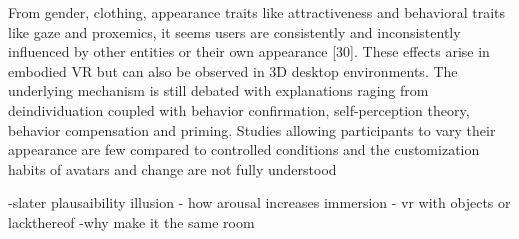 From gender, clothing, appearance traits like attractiveness and behavioral traits like gaze and proxemics, it seems users are consistently and inconsistently influenced by other entities or their own appearance [30].  These effects arise in embodied VR but can also be observed in 3D desktop environments. The underlying mechanism is still debated with explanations raging from deindividuation coupled with behavior confirmation, self-perception theory, behavior compensation and priming. Studies allowing participants to vary their appearance are few compared to controlled  conditions and the customization habits of avatars and change are not fully understood



-slater plausaibility illusion
- how arousal increases immersion
- vr with objects or lackthereof
-why make it the same room



